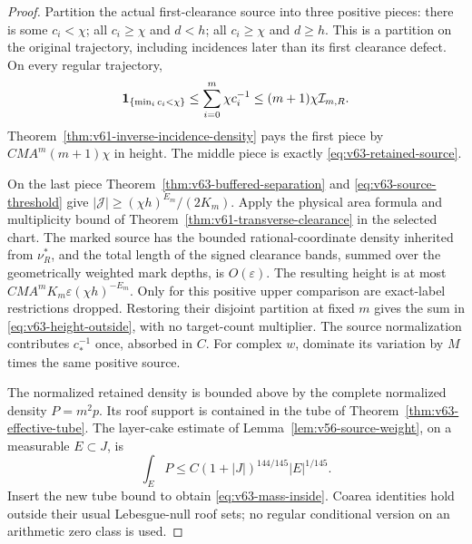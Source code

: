 \begin{proof}
Partition the actual first-clearance source into three positive pieces:
there is some $c_i<\chi$; all $c_i\ge\chi$ and $d<h$; all
$c_i\ge\chi$ and $d\ge h$. This is a partition on the original
trajectory, including incidences later than its first clearance defect.
On every regular trajectory,
\[
 \mathbf1_{\{\min_i c_i<\chi\}}
 \le\sum_{i=0}^m\chi c_i^{-1}\le(m+1)\chi\mathcal I_{m,R}.
\]
Theorem~\ref{thm:v61-inverse-incidence-density} pays the first piece
by $CMA^m(m+1)\chi$ in height. The middle piece is exactly
\eqref{eq:v63-retained-source}.

On the last piece Theorem~\ref{thm:v63-buffered-separation} and
\eqref{eq:v63-source-threshold} give
$|\mathcal J|\ge(\chi h)^{E_m}/(2K_m)$. Apply the physical area
formula and multiplicity bound of
Theorem~\ref{thm:v61-transverse-clearance} in the selected chart.
The marked source has the bounded rational-coordinate density inherited
from $\nu_R^*$, and the total length of the signed clearance bands,
summed over the geometrically weighted mark depths, is $O(\varepsilon)$.
The resulting height is at most
$CMA^mK_m\varepsilon(\chi h)^{-E_m}$.
Only for this positive upper comparison are exact-label restrictions
dropped. Restoring their disjoint partition at fixed $m$ gives the sum
in \eqref{eq:v63-height-outside}, with no target-count multiplier.
The source normalization contributes $c_*^{-1}$ once, absorbed in $C$.
For complex $w$, dominate its variation by $M$ times the same positive
source.

The normalized retained density is bounded above by the complete
normalized density $P=m^2p$. Its roof support is contained in the tube
of Theorem~\ref{thm:v63-effective-tube}. The layer-cake estimate of
Lemma~\ref{lem:v56-source-weight}, on a measurable $E\subset J$, is
\[
 \int_E P\le C(1+|J|)^{144/145}|E|^{1/145}.
\]
Insert the new tube bound to obtain \eqref{eq:v63-mass-inside}.
Coarea identities hold outside their usual Lebesgue-null roof sets;
no regular conditional version on an arithmetic zero class is used.
\end{proof}

